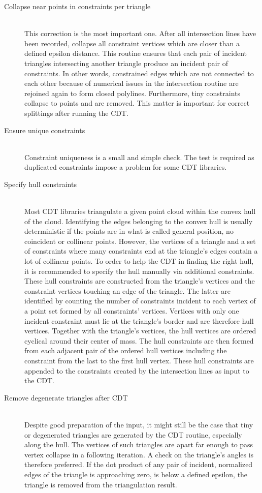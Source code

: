 \begin{description}
	
	\item[Collapse near points in constraints per triangle] \hfill \\
	This correction is the most important one.
	After all intersection lines have been recorded, collapse all constraint vertices which are closer than a defined epsilon distance.
	This routine ensures that each pair of incident triangles intersecting another triangle produce an incident pair of constraints.
	In other words, constrained edges which are not connected to each other because of numerical issues in the intersection routine are rejoined again to form closed polylines.
	Furthermore, tiny constraints collapse to points and are removed.
	This matter is important for correct splittings after running the CDT.
	
	
	\item[Ensure unique constraints] \hfill \\
	Constraint uniqueness is a small and simple check.
	The test is required as duplicated constraints impose a problem for some CDT libraries.
	
	
	\item[Specify hull constraints] \hfill \\
	Most CDT libraries triangulate a given point cloud within the convex hull of the cloud.
	Identifying the edges belonging to the convex hull is usually deterministic if the points are in what is called general position, \ie no coincident or collinear points.
	However, the vertices of a triangle and a set of constraints where many constraints end at the triangle's edges contain a lot of collinear points.
	To order to help the CDT in finding the right hull, it is recommended to specify the hull manually via additional constraints.
	These hull constraints are constructed from the triangle's vertices and the constraint vertices touching an edge of the triangle.
	The latter are identified by counting the number of constraints incident to each vertex of a point set formed by all constraints' vertices.
	Vertices with only one incident constraint must lie at the triangle's border and are therefore hull vertices.
	Together with the triangle's vertices, the hull vertices are ordered cyclical around their center of mass.
	The hull constraints are then formed from each adjacent pair of the ordered hull vertices including the constraint from the last to the first hull vertex.
	These hull constraints are appended to the constraints created by the intersection lines as input to the CDT.
	
	
	\item[Remove degenerate triangles after CDT] \hfill \\
	Despite good preparation of the input, it might still be the case that tiny or degenerated triangles are generated by the CDT routine, especially along the hull.
	The vertices of such triangles are apart far enough to pass vertex collapse in a following iteration.
	A check on the triangle's angles is therefore preferred.
	If the dot product of any pair of incident, normalized edges of the triangle is approaching zero, \ie is below a defined epsilon, the triangle is removed from the triangulation result.
\end{description}


